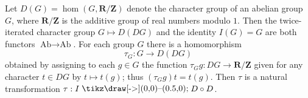 Let $D(G) = \hom(G, \mathbf{R}/\mathbf{Z})$ denote the character group of an abelian group $G$, where $\mathbf{R}/\mathbf{Z}$ is the additive group of real numbers modulo $1$. Then the twice-iterated character group $G \mapsto D(DG)$ and the identity $I(G) = G$ are both functors $\text{Ab} \rightarrow \text{Ab}$. For each group $G$ there is a homomorphism
$$
\tau_G: G \rightarrow D(DG)
$$
obtained by assigning to each $g \in G$ the function $\tau_G g: DG \rightarrow \mathbf{R}/\mathbf{Z}$ given for any character $t \in DG$ by $t \mapsto t(g)$; thus $(\tau_G g)t = t(g)$. Then $\tau$ is a natural transformation $\tau: I \mathbin{\raisebox{0.5pt}{\hspace{0.5pt}\tikz\draw[->](0,0)--(0.5,0);\hspace{0.5pt}}} D \circ D$.
